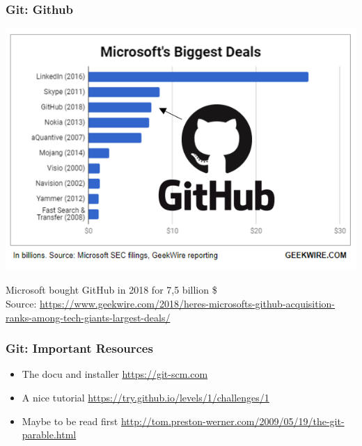 \documentclass{beamer} %
\begin{document}
\begin{frame}[t]
\frametitle{Git: Github}
	\begin{center}
		
		\includegraphics[scale=0.75]{assets/Microsoftbiggestdeals.png}
		
		Microsoft bought GitHub in 2018 for 7,5 billion \$\\
		Source: \url{https://www.geekwire.com/2018/heres-microsofts-github-acquisition-ranks-among-tech-giants-largest-deals/}
		
	\end{center}
\end{frame}

\begin{frame}[t]
\frametitle{Git: Important Resources}
\begin{itemize}
    \setlength\itemsep{1em}
	\item The docu and installer \newline \url{https://git-scm.com} \newline
    \item A nice tutorial \newline \url{https://try.github.io/levels/1/challenges/1} \newline
    \item Maybe to be read first \newline \url{http://tom.preston-werner.com/2009/05/19/the-git-parable.html} \newline
\end{itemize}
\end{frame}
\end{document}

